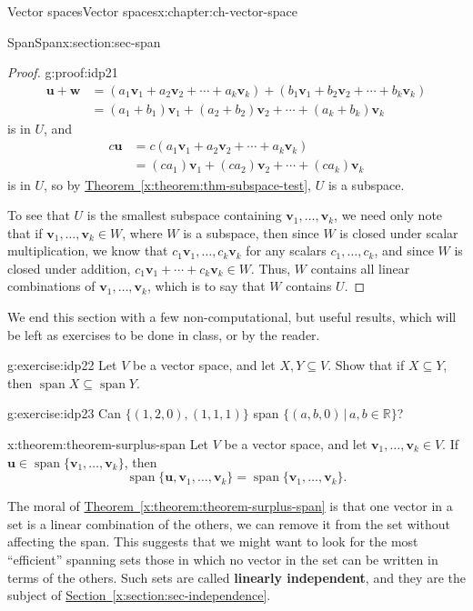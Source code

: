 \documentclass[oneside,10pt,]{book}
\newcommand{\xreffont}{\relax}
\newcommand{\terminology}[1]{\textbf{#1}}
\numberwithin{equation}{section}
\newcommand{\spn}{\operatorname{span}}
\newcommand{\R}{\mathbb{R}}
\newcommand{\uu}{\mathbf{u}}
\newcommand{\vv}{\mathbf{v}}
\newcommand{\ww}{\mathbf{w}}
\newcommand{\amp}{&}
\begin{document}
\begin{chapterptx}{Vector spaces}{}{Vector spaces}{}{}{x:chapter:ch-vector-space}
\begin{sectionptx}{Span}{}{Span}{}{}{x:section:sec-span}
\begin{proof}{}{g:proof:idp21}
\begin{align*}
\uu+\ww \amp =(a_1\vv_1+a_2\vv_2+\cdots +a_k\vv_k)+(b_1\vv_1+b_2\vv_2+\cdots +b_k\vv_k)\\
\amp = (a_1+b_1)\vv_1+(a_2+b_2)\vv_2+\cdots + (a_k+b_k)\vv_k
\end{align*}
is in \(U\), and%
\begin{align*}
c\uu \amp =c(a_1\vv_1+a_2\vv_2+\cdots +a_k\vv_k)\\
\amp =(ca_1)\vv_1+(ca_2)\vv_2+\cdots + (ca_k)\vv_k
\end{align*}
is in \(U\), so by \hyperref[x:theorem:thm-subspace-test]{Theorem~{\xreffont\ref{x:theorem:thm-subspace-test}}}, \(U\) is a subspace.%
\par
To see that \(U\) is the smallest subspace containing \(\vv_1,\ldots, \vv_k\), we need only note that if \(\vv_1,\ldots, \vv_k\in W\), where \(W\) is a subspace, then since \(W\) is closed under scalar multiplication, we know that \(c_1\vv_1,\ldots, c_k\vv_k\) for any scalars \(c_1,\ldots, c_k\), and since \(W\) is closed under addition, \(c_1\vv_1+\cdots+c_k\vv_k\in W\). Thus, \(W\) contains all linear combinations of \(\vv_1,\ldots, \vv_k\), which is to say that \(W\) contains \(U\).%
\end{proof}
We end this section with a few non-computational, but useful results, which will be left as exercises to be done in class, or by the reader.%
\begin{inlineexercise}{}{g:exercise:idp22}%
Let \(V\) be a vector space, and let \(X,Y\subseteq V\). Show that if \(X\subseteq Y\), then \(\spn X \subseteq \spn Y\).%
\end{inlineexercise}%
\begin{inlineexercise}{}{g:exercise:idp23}%
Can \(\{(1,2,0), (1,1,1)\}\) span \(\{(a,b,0)\,|\, a,b \in\R\}\)?%
\end{inlineexercise}%
\begin{theorem}{}{}{x:theorem:theorem-surplus-span}%
Let \(V\) be a vector space, and let \(\vv_1,\ldots, \vv_k\in V\). If \(\uu\in \spn\{\vv_1,\ldots, \vv_k\}\), then%
\begin{equation*}
\spn\{\uu,\vv_1,\ldots, \vv_k\} = \spn\{\vv_1,\ldots, \vv_k\}\text{.}
\end{equation*}
%
\end{theorem}
The moral of \hyperref[x:theorem:theorem-surplus-span]{Theorem~{\xreffont\ref{x:theorem:theorem-surplus-span}}} is that one vector in a set is a linear combination of the others, we can remove it from the set without affecting the span. This suggests that we might want to look for the most ``efficient'' spanning sets \textendash{} those in which no vector in the set can be written in terms of the others. Such sets are called \terminology{linearly independent}, and they are the subject of \hyperref[x:section:sec-independence]{Section~{\xreffont\ref{x:section:sec-independence}}}.%

\end{sectionptx}
\end{chapterptx}
\end{document}
